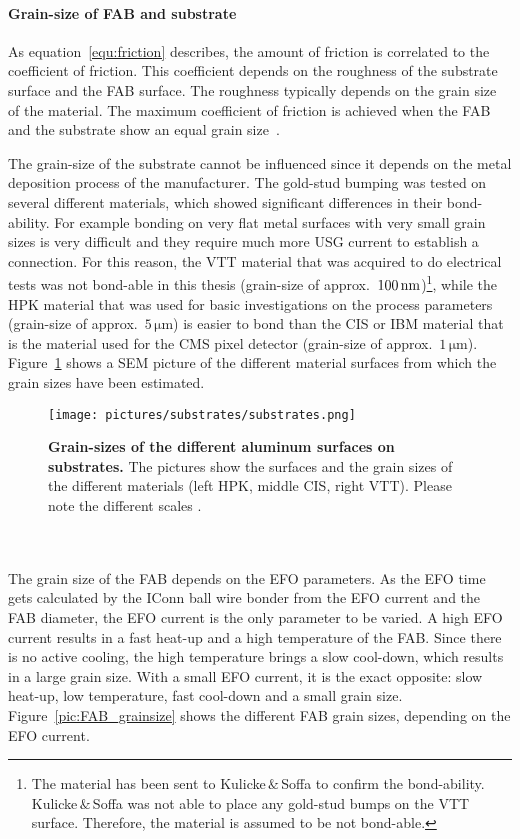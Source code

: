 \paragraph*{Grain-size of \acl{FAB} and substrate}\label{sec:grain_size}
As equation~\ref{equ:friction} describes, the amount of friction is correlated to the coefficient of friction. This coefficient depends on the roughness of the substrate surface and the \ac{FAB} surface. The roughness typically depends on the grain size of the material. The maximum coefficient of friction is achieved when the \ac{FAB} and the substrate show an equal grain size~\cite{Cas14}.

The grain-size of the substrate cannot be influenced since it depends on the metal deposition process of the manufacturer. The gold-stud bumping was tested on several different materials, which showed significant differences in their bond-ability. For example bonding on very flat metal surfaces with very small grain sizes is very difficult and they require much more \ac{USG} current to establish a connection. For this reason, the \ac{VTT} material that was acquired to do electrical tests was not bond-able in this thesis (grain-size of approx.~$100\,\rm{nm}$)\footnote{The material has been sent to Kulicke$\,\&\,$Soffa to confirm the bond-ability. Kulicke$\,\&\,$Soffa was not able to place any gold-stud bumps on the \ac{VTT} surface. Therefore, the material is assumed to be not bond-able.}, while the \ac{HPK} material that was used for basic investigations on the process parameters (grain-size of approx.~$5\,\si{\micro \meter}$) is easier to bond than the CIS or IBM material that is the material used for the \ac{CMS} pixel detector (grain-size of approx.~$1\,\si{\micro \meter}$). Figure~\ref{pic:surface_grainsizes} shows a \ac{SEM} picture of the different material surfaces from which the grain sizes have been estimated.
\begin{figure}
\begin{center}
\texttt{[image: pictures/substrates/substrates.png]}
\end{center}
\caption[Grain-sizes of the different aluminum surfaces on substrates]{\textbf{Grain-sizes of the different aluminum surfaces on substrates.} The pictures show the surfaces and the grain sizes of the different materials (left HPK, middle CIS, right \acs{VTT}). Please note the different scales \cite{Jun14}.}\label{pic:surface_grainsizes}
\end{figure}
\\
\\The grain size of the \ac{FAB} depends on the \ac{EFO} parameters. As the \ac{EFO} time gets calculated by the IConn ball wire bonder from the \ac{EFO} current and the \ac{FAB} diameter, the \ac{EFO} current is the only parameter to be varied. A high \ac{EFO} current results in a fast heat-up and a high temperature of the \ac{FAB}. Since there is no active cooling, the high temperature brings a slow cool-down, which results in a large grain size. With a small \ac{EFO} current, it is the exact opposite: slow heat-up, low temperature, fast cool-down and a small grain size. Figure~\ref{pic:FAB_grainsize} shows the different \ac{FAB} grain sizes, depending on the \ac{EFO} current.
